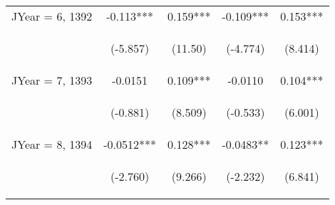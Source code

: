 \documentclass[]{standalone}
\begin{document}
\begin{tabular}{lcccc}
    JYear = 6, 1392  & -0.113***                                      & 0.159***                                       & -0.109***                                      & 0.153***                                       \\
    \vspace{4pt}     & \begin{footnotesize}(-5.857)\end{footnotesize} & \begin{footnotesize}(11.50)\end{footnotesize}  & \begin{footnotesize}(-4.774)\end{footnotesize} & \begin{footnotesize}(8.414)\end{footnotesize}  \\
    JYear = 7, 1393  & -0.0151                                        & 0.109***                                       & -0.0110                                        & 0.104***                                       \\
    \vspace{4pt}     & \begin{footnotesize}(-0.881)\end{footnotesize} & \begin{footnotesize}(8.509)\end{footnotesize}  & \begin{footnotesize}(-0.533)\end{footnotesize} & \begin{footnotesize}(6.001)\end{footnotesize}  \\
    JYear = 8, 1394  & -0.0512***                                     & 0.128***                                       & -0.0483**                                      & 0.123***                                       \\
    \vspace{4pt}     & \begin{footnotesize}(-2.760)\end{footnotesize} & \begin{footnotesize}(9.266)\end{footnotesize}  & \begin{footnotesize}(-2.232)\end{footnotesize} & \begin{footnotesize}(6.841)\end{footnotesize}  \\

\end{tabular}
\end{document}
